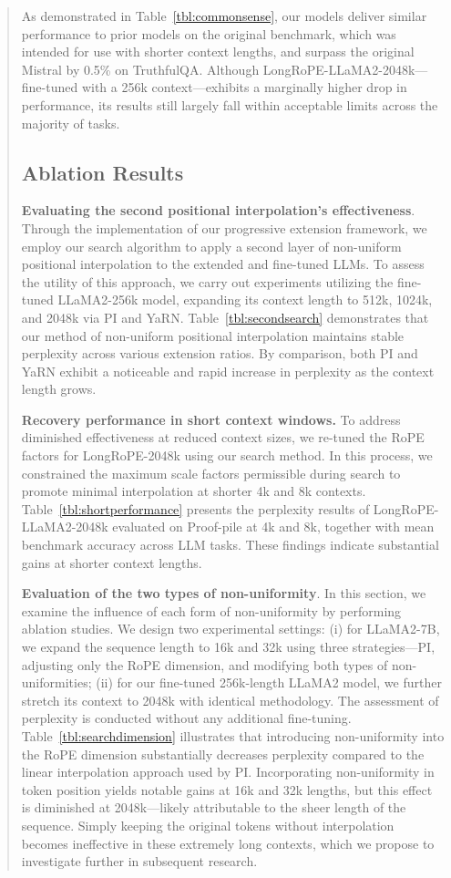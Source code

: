 \begin{abstract}
As demonstrated in Table~\ref{tbl:commonsense}, our models deliver similar performance to prior models on the original benchmark, which was intended for use with shorter context lengths, and surpass the original Mistral by 0.5\% on TruthfulQA. Although LongRoPE-LLaMA2-2048k—fine-tuned with a 256k context—exhibits a marginally higher drop in performance, its results still largely fall within acceptable limits across the majority of tasks.

\subsection{Ablation Results}

\textbf{Evaluating the second positional interpolation's effectiveness}. Through the implementation of our progressive extension framework, we employ our search algorithm to apply a second layer of non-uniform positional interpolation to the extended and fine-tuned LLMs. To assess the utility of this approach, we carry out experiments utilizing the fine-tuned LLaMA2-256k model, expanding its context length to 512k, 1024k, and 2048k via PI and YaRN. Table~\ref{tbl:secondsearch} demonstrates that our method of non-uniform positional interpolation maintains stable perplexity across various extension ratios. By comparison, both PI and YaRN exhibit a noticeable and rapid increase in perplexity as the context length grows.

\textbf{Recovery performance in short context windows.} To address diminished effectiveness at reduced context sizes, we re-tuned the RoPE factors for LongRoPE-2048k using our search method. In this process, we constrained the maximum scale factors permissible during search to promote minimal interpolation at shorter 4k and 8k contexts. Table~\ref{tbl:shortperformance} presents the perplexity results of LongRoPE-LLaMA2-2048k evaluated on Proof-pile at 4k and 8k, together with mean benchmark accuracy across LLM tasks. These findings indicate substantial gains at shorter context lengths.

\textbf{Evaluation of the two types of non-uniformity}. In this section, we examine the influence of each form of non-uniformity by performing ablation studies. We design two experimental settings: (i) for LLaMA2-7B, we expand the sequence length to 16k and 32k using three strategies—PI, adjusting only the RoPE dimension, and modifying both types of non-uniformities; (ii) for our fine-tuned 256k-length LLaMA2 model, we further stretch its context to 2048k with identical methodology. The assessment of perplexity is conducted without any additional fine-tuning. Table~\ref{tbl:searchdimension} illustrates that introducing non-uniformity into the RoPE dimension substantially decreases perplexity compared to the linear interpolation approach used by PI. Incorporating non-uniformity in token position yields notable gains at 16k and 32k lengths, but this effect is diminished at 2048k—likely attributable to the sheer length of the sequence. Simply keeping the original tokens without interpolation becomes ineffective in these extremely long contexts, which we propose to investigate further in subsequent research.


\end{abstract}

